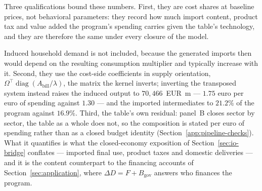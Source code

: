 

Three qualifications bound these numbers. First, they are cost shares at
baseline prices, not behavioral parameters: they record how much import content,
product tax and value added the program's spending carries given the table's
technology, and they are therefore the same under every closure of the model.

Induced household demand is not included, because the generated imports then would depend on the resulting consumption multiplier and typically increase with it. Second, they use the
cost-side coefficients in supply orientation,
$\Omega^{\top}\operatorname{diag}(A_{\mathrm{bill}}/\lambda)$, the matrix the
kernel inverts; inverting the transposed system instead raises the induced output
to $70{,}466$~EUR~m --- $1.75$ euro per euro of spending against $1.30$ --- and
the imported intermediates to $21.2\%$ of the program against $16.9\%$. Third, the table's own residual:
panel~B closes sector by sector, the table as a whole does not, so the composition
is stated per euro of spending rather than as a closed budget identity
(Section~\ref{app:pipeline-checks}). What it quantifies is what the closed-economy
exposition of Section~\ref{sec:io-bridge} conflates --- imported final use, product taxes and
domestic deliveries --- and it is the content counterpart to the financing accounts
of Section~\ref{sec:application}, where $\Delta D = F + B_{\mathrm{gov}}$ answers
who finances the program.


